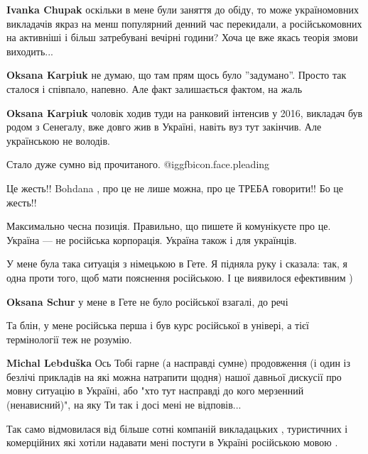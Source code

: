 \begin{itemize}
\begin{itemize}
\textbf{Ivanka Chupak} оскільки в мене були заняття до обіду, то може україномовних викладачів якраз на менш популярний денний час перекидали, а російськомовних на активніші і більш затребувані вечірні години? Хоча це вже якась теорія змови виходить...

\textbf{Oksana Karpiuk} не думаю, що там прям щось було ''задумано''. Просто так сталося і співпало, напевно. Але факт залишається фактом, на жаль

\textbf{Oksana Karpiuk} чоловік ходив туди на ранковий інтенсив у 2016, викладач був родом з Сенегалу, вже довго жив в Україні, навіть вуз тут закінчив. Але українською не володів.
\end{itemize} %

Стало дуже сумно від прочитаного. @igg{fbicon.face.pleading} 

Це жесть!! Bohdana , про це не лише можна, про це ТРЕБА говорити!! Бо це жесть!!

Максимально чесна позиція. Правильно, що пишете й комунікуєте про це. Україна —
не російська корпорація. Україна також і для українців.


У мене була така ситуація з німецькою в Гете. Я підняла руку і сказала: так, я
одна проти того, щоб мати пояснення російською. І це виявилося ефективним )

\begin{itemize} %
\textbf{Oksana Schur} у мене в Гете не було російської взагалі, до речі
\end{itemize} %

Та блін, у мене російська перша і був курс російської в універі, а тієї термінології теж не розумію.

\textbf{Michal Lebduška} Ось Тобі гарне (а насправді сумне) продовження (і один
із безлічі прикладів на які можна натрапити щодня) нашої давньої дискусії про
мовну ситуацію в Україні, або "хто тут насправді до кого мерзенний
(ненависний)", на яку Ти так і досі мені не відповів...


Так само відмовилася від більше сотні компаній викладацьких , туристичних і
комерційних які хотіли надавати мені постуги в Україні російською мовою .



\end{itemize}
